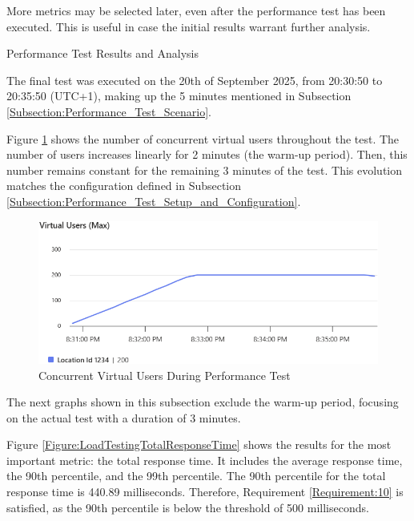 \documentclass[12pt, reqno]{amsbook}
\makeatletter
\def\subsection{\@startsection{subsection}{2}%
      \z@{.5\linespacing\@plus.7\linespacing}{.25\linespacing}%
      {\normalfont\bfseries\flushleft}}
\theoremstyle{definition}
\theoremstyle{definition}
\numberwithin{section}{chapter}
\numberwithin{table}{chapter}
\numberwithin{figure}{chapter}
\makeatother
\begin{document}
More metrics may be selected later, even after the performance test has been executed. This is useful in case the initial results warrant further analysis.

\subsection{Performance Test Results and Analysis}
\label{Subsection:Performance_Test_Results_and_Analysis}

The final test was executed on the 20th of September 2025, from 20:30:50 to 20:35:50 (UTC+1), making up the 5 minutes mentioned in Subsection \ref{Subsection:Performance_Test_Scenario}.

Figure \ref{Figure:LoadTestingVirtualUsers} shows the number of concurrent virtual users throughout the test. The number of users increases linearly for 2 minutes (the warm-up period). Then, this number remains constant for the remaining 3 minutes of the test. This evolution matches the configuration defined in Subsection \ref{Subsection:Performance_Test_Setup_and_Configuration}.

\begin{figure}[H]
  \centering
  \includegraphics[width=0.98\linewidth]{images/LoadTestingVirtualUsers.png}
  \caption{\label{Figure:LoadTestingVirtualUsers}Concurrent Virtual Users During Performance Test}
\end{figure}

The next graphs shown in this subsection exclude the warm-up period, focusing on the actual test with a duration of 3 minutes.

Figure \ref{Figure:LoadTestingTotalResponseTime} shows the results for the most important metric: the total response time. It includes the average response time, the 90th percentile, and the 99th percentile. The 90th percentile for the total response time is 440.89 milliseconds. Therefore, Requirement \ref{Requirement:10} is satisfied, as the 90th percentile is below the threshold of 500 milliseconds.
\end{document}
